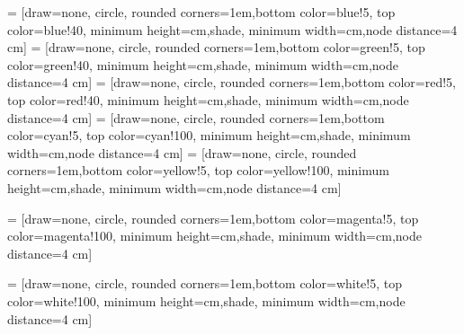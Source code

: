  = [draw=none, circle, rounded corners=1em,bottom color=blue!5, top color=blue!40,
    minimum height=\R*\overlap cm,shade, minimum width=\R*\overlap cm,node distance=4 cm]
     = [draw=none, circle, rounded corners=1em,bottom color=green!5, top color=green!40,
    minimum height=\R*\overlap cm,shade, minimum width=\R*\overlap cm,node distance=4 cm]
     = [draw=none, circle, rounded corners=1em,bottom color=red!5, top color=red!40,
    minimum height=\R*\overlap cm,shade, minimum width=\R*\overlap cm,node distance=4 cm]
         = [draw=none, circle, rounded corners=1em,bottom color=cyan!5, top color=cyan!100,
    minimum height=\R*\overlap cm,shade, minimum width=\R*\overlap cm,node distance=4 cm]
     = [draw=none, circle, rounded corners=1em,bottom color=yellow!5, top color=yellow!100,
    minimum height=\R*\overlap cm,shade, minimum width=\R*\overlap cm,node distance=4 cm]
    
     = [draw=none, circle, rounded corners=1em,bottom color=magenta!5, top color=magenta!100,
    minimum height=\R*\overlap cm,shade, minimum width=\R*\overlap cm,node distance=4 cm]
    
         = [draw=none, circle, rounded corners=1em,bottom color=white!5, top color=white!100,
    minimum height=\R*\overlap cm,shade, minimum width=\R*\overlap cm,node distance=4 cm]
    
